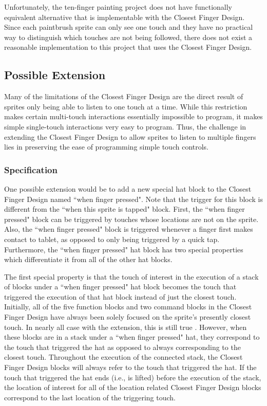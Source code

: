 Unfortunately, the ten-finger painting project does not have functionally equivalent alternative that is implementable with the Closest Finger Design. Since each paintbrush sprite can only see one touch and they have no practical way to distinguish which touches are not being followed, there does not exist a reasonable implementation to this project that uses the Closest Finger Design.

\subsection{Possible Extension}

Many of the limitations of the Closest Finger Design are the direct result of sprites only being able to listen to one touch at a time. While this restriction makes certain multi-touch interactions essentially impossible to program, it makes simple single-touch interactions very easy to program. Thus, the challenge in extending the Closest Finger Design to allow sprites to listen to multiple fingers lies in preserving the ease of programming simple touch controls.

\subsubsection{Specification}
One possible extension would be to add a new special hat block to the Closest Finger Design named ``when finger pressed". Note that the trigger for this block is different from the ``when this sprite is tapped" block. First, the ``when finger pressed" block can be triggered by touches whose locations are not on the sprite. Also, the ``when finger pressed" block is triggered whenever a finger first makes contact to tablet, as opposed to only being triggered by a quick tap. Furthermore, the ``when finger pressed" hat block has two special properties which differentiate it from all of the other hat blocks.

The first special property is that the touch of interest in the execution of a stack of blocks under a ``when finger pressed"  hat block becomes the touch that triggered the execution of that hat block instead of just the closest touch. Initially, all of the five function blocks and two command blocks in the Closest Finger Design have always been solely focused on the sprite's presently closest touch. In nearly all case with the extension, this is still true . However, when these blocks are in a stack under a ``when finger pressed" hat, they correspond to the touch that triggered the hat as opposed to always corresponding to the closest touch. Throughout the execution of the connected stack, the Closest Finger Design blocks will always refer to the touch that triggered the hat. If the touch that triggered the hat ends (i.e., is lifted) before the execution of the stack, the location of interest for all of the location related Closest Finger Design blocks correspond to the last location of the triggering touch. 

